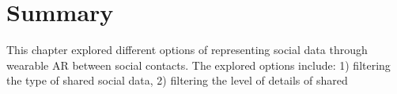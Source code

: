 \section{Summary}

This chapter explored different options of representing social data through wearable AR between social contacts. The explored options include: 1) filtering the type of shared social data, 2) filtering the level of details of shared 

